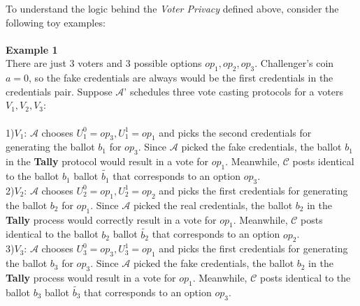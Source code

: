 \documentclass[12pt]{article}
\begin{document}
To understand the logic behind the \textit{Voter Privacy} defined above, consider the following toy examples:\\\\
\textbf{Example 1}\\
There are just 3 voters and 3 possible options $op_1,op_2,op_3$. Challenger's coin $a=0$, so the fake credentials are always would be the first credentials in the credentials pair.
Suppose  $\mathcal{A}$' schedules three vote casting protocols for a voters $V_1,V_2,V_3$: \\\\
1)$\boxed{V_1}$:  $\mathcal{A}$ chooses $U^0_1 = op_3, U^1_1 = op_1$ and picks the second credentials for generating the ballot $b_1$ for $op_3$. Since  $\mathcal{A}$ picked the fake credentials, the ballot $b_1$ in the \textbf{Tally} protocol would result in a vote for $op_1$. Meanwhile, $\mathcal{C}$ posts identical to the ballot $b_1$ ballot $\tilde{b_1}$ that corresponds to an option $op_3$.\\
2)$\boxed{V_2}$: $\mathcal{A}$ chooses $U^0_2 = op_1, U^1_2 = op_2$ and picks the first credentials for generating the ballot $b_2$ for $op_1$. Since  $\mathcal{A}$ picked the real credentials, the ballot $b_2$ in the \textbf{Tally} process would correctly result in a vote for $op_1$. Meanwhile, $\mathcal{C}$ posts identical to the ballot $b_2$ ballot $\tilde{b_2}$ that corresponds to an option $op_2$.\\
3)$\boxed{V_3}$:  $\mathcal{A}$ chooses $U^0_3 = op_3, U^1_3 = op_1$ and picks the first credentials for generating the ballot $b_3$ for $op_3$. Since  $\mathcal{A}$ picked the fake credentials, the ballot $b_2$ in the \textbf{Tally} process would  result in a vote for $op_1$. Meanwhile, $\mathcal{C}$ posts identical to the ballot $b_3$ ballot $\tilde{b_3}$ that corresponds to an option $op_3$.\\
\end{document}
